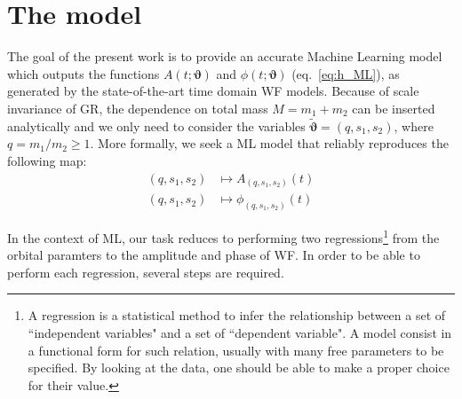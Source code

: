 \section{The model}
\label{sec:model}
%
The goal of the present work is to provide an accurate Machine Learning model which outputs the functions $A(t;\boldsymbol{\vartheta})$ and $\phi(t;\boldsymbol{\vartheta})$ (eq.~\eqref{eq:h_ML}), as generated by the state-of-the-art time domain WF models.
Because of scale invariance of GR, the dependence on total mass $M= m_1+m_2$ can be inserted analytically \cite{Arbey2019scaling} and we only need to consider the variables $\tilde{\boldsymbol{\vartheta}} = (q, s_1, s_2)$, where $q= m_1/m_2 \geq 1$.
More formally, we seek a ML model that reliably reproduces the following map:
\begin{align}
	(q, s_1, s_2) &\longmapsto A_{(q, s_1, s_2)}(t) \label{eq:objective_amp}\\
	(q, s_1, s_2) &\longmapsto \phi_{(q, s_1, s_2)}(t) \label{eq:objective_ph}
\end{align}
\par
In the context of ML, our task reduces to performing two regressions\footnote{A regression is a statistical method to infer the relationship between a set of ``independent variables" and a set of ``dependent variable". A model consist in a functional form for such relation, usually with many free parameters to be specified. By looking at the data, one should be able to make a proper choice for their value.} 
from the orbital paramters to the amplitude and phase of WF. 
In order to be able to perform each regression, several steps are required.

